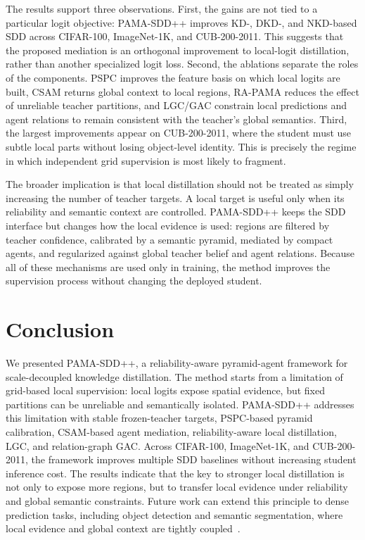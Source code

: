 \documentclass[a4paper,fleqn]{cas-dc}
\begin{document}
The results support three observations. First, the gains are not tied to a
particular logit objective: PAMA-SDD++ improves KD-, DKD-, and NKD-based SDD
across CIFAR-100, ImageNet-1K, and CUB-200-2011. This suggests that the
proposed mediation is an orthogonal improvement to local-logit distillation,
rather than another specialized logit loss. Second, the ablations separate the
roles of the components. PSPC improves the feature basis on which local logits
are built, CSAM returns global context to local regions, RA-PAMA reduces the
effect of unreliable teacher partitions, and LGC/GAC constrain local
predictions and agent relations to remain consistent with the teacher's global
semantics. Third, the largest improvements appear on CUB-200-2011, where the
student must use subtle local parts without losing object-level identity. This
is precisely the regime in which independent grid supervision is most likely
to fragment.

The broader implication is that local distillation should not be treated as
simply increasing the number of teacher targets. A local target is useful only
when its reliability and semantic context are controlled. PAMA-SDD++ keeps the
SDD interface but changes how the local evidence is used: regions are filtered
by teacher confidence, calibrated by a semantic pyramid, mediated by compact
agents, and regularized against global teacher belief and agent relations.
Because all of these mechanisms are used only in training, the method improves
the supervision process without changing the deployed student.

\section{Conclusion}
\label{sec:conclusion}
We presented PAMA-SDD++, a reliability-aware pyramid-agent framework for
scale-decoupled knowledge distillation. The method starts from a limitation of
grid-based local supervision: local logits expose spatial evidence, but fixed
partitions can be unreliable and semantically isolated. PAMA-SDD++ addresses
this limitation with stable frozen-teacher targets, PSPC-based pyramid
calibration, CSAM-based agent mediation, reliability-aware local
distillation, LGC, and relation-graph GAC. Across CIFAR-100, ImageNet-1K, and
CUB-200-2011, the framework improves multiple SDD baselines without increasing
student inference cost. The results indicate that the key to stronger local
distillation is not only to expose more regions, but to transfer local
evidence under reliability and global semantic constraints. Future work can
extend this principle to dense prediction tasks, including object detection
and semantic segmentation, where local evidence and global context are tightly
coupled~\cite{carion2020detr,qiao2021detectors,xie2021segformer}.
\end{document}
